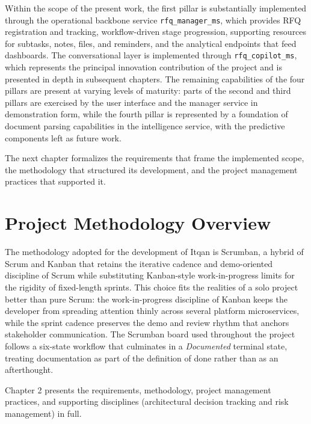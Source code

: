 Within the scope of the present work, the first pillar is substantially implemented through the operational backbone service \texttt{rfq\_manager\_ms}, which provides RFQ registration and tracking, workflow-driven stage progression, supporting resources for subtasks, notes, files, and reminders, and the analytical endpoints that feed dashboards. The conversational layer is implemented through \texttt{rfq\_copilot\_ms}, which represents the principal innovation contribution of the project and is presented in depth in subsequent chapters. The remaining capabilities of the four pillars are present at varying levels of maturity: parts of the second and third pillars are exercised by the user interface and the manager service in demonstration form, while the fourth pillar is represented by a foundation of document parsing capabilities in the intelligence service, with the predictive components left as future work.

The next chapter formalizes the requirements that frame the implemented scope, the methodology that structured its development, and the project management practices that supported it.

\section{Project Methodology Overview}
The methodology adopted for the development of Itqan is Scrumban, a hybrid of Scrum and Kanban that retains the iterative cadence and demo-oriented discipline of Scrum while substituting Kanban-style work-in-progress limits for the rigidity of fixed-length sprints. This choice fits the realities of a solo project better than pure Scrum: the work-in-progress discipline of Kanban keeps the developer from spreading attention thinly across several platform microservices, while the sprint cadence preserves the demo and review rhythm that anchors stakeholder communication. The Scrumban board used throughout the project follows a six-state workflow that culminates in a \textit{Documented} terminal state, treating documentation as part of the definition of done rather than as an afterthought.

Chapter 2 presents the requirements, methodology, project management practices, and supporting disciplines (architectural decision tracking and risk management) in full.

